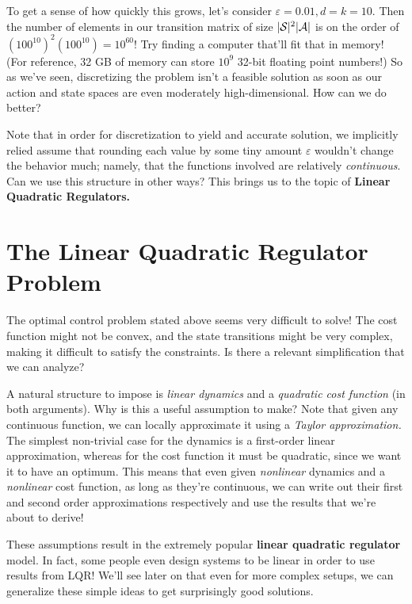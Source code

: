 \documentclass[../main/main]{subfiles}
\begin{document}
To get a sense of how quickly this grows, let's consider $\varepsilon = 0.01, d = k = 10$. Then the number of elements in our transition matrix of size $|\mathcal{S}|^2 |\mathcal{A}|$ is on the order of $(100^{10})^2 (100^{10}) = 10^{60}$!
Try finding a computer that'll fit that in memory! (For reference, 32 GB of memory can store $10^9$ 32-bit floating point numbers!)
So as we've seen, discretizing the problem isn't a feasible solution as soon as
our action and state spaces are even moderately high-dimensional.
How can we do better?

Note that in order for discretization to yield and accurate solution,
we implicitly relied assume that rounding each value by some tiny amount $\varepsilon$
wouldn't change the behavior much; namely, that the functions involved are relatively \emph{continuous}.
Can we use this structure in other ways? This brings us to the topic of \textbf{Linear Quadratic Regulators.}

\section{The Linear Quadratic Regulator Problem} \label{sec:lqr}

The optimal control problem stated above seems very difficult to solve!
The cost function might not be convex, and the state transitions might be very complex, making it difficult to satisfy the constraints.
Is there a relevant simplification that we can analyze?

A natural structure to impose is \emph{linear dynamics} and a \emph{quadratic cost function} (in both arguments).
Why is this a useful assumption to make?
Note that given any continuous function, we can locally approximate it using a \emph{Taylor approximation.}
The simplest non-trivial case for the dynamics is a first-order linear approximation,
whereas for the cost function it must be quadratic, since we want it to have an optimum.
This means that even given \emph{nonlinear} dynamics and a \emph{nonlinear} cost function,
as long as they're continuous,
we can write out their first and second order approximations respectively
and use the results that we're about to derive!

These assumptions result in the extremely popular \textbf{linear quadratic regulator} model.
In fact, some people even design systems to be linear in order to use results from LQR!
We'll see later on that even for more complex setups,
we can generalize these simple ideas to get surprisingly good solutions.
\end{document}
